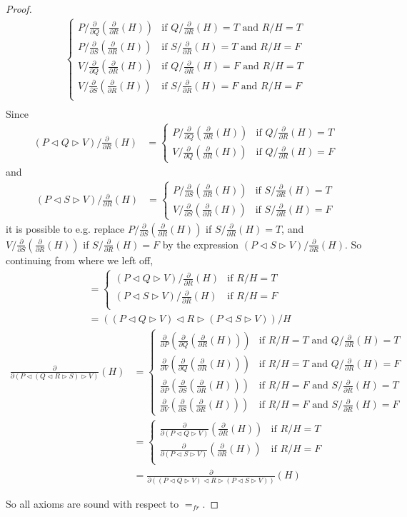 \documentclass[a4paper,twoside,openright]{report}
\newcommand{\dd}[1]{\frac{\partial}{\partial #1}}
\newcommand{\lef}{\ensuremath{\triangleleft}}
\newcommand{\rig}{\ensuremath{\triangleright}}
\begin{document}
\begin{proof}
\begin{align*}
\begin{cases}
P/\dd Q(\dd R(H)) & \text{if $Q/\dd R(H)=T$ and $R/H=T$}\\
P/\dd S(\dd R(H)) & \text{if $S/\dd R(H)=T$ and $R/H=F$}\\
V/\dd Q(\dd R(H)) & \text{if $Q/\dd R(H)=F$ and $R/H=T$}\\
V/\dd S(\dd R(H)) & \text{if $S/\dd R(H)=F$ and $R/H=F$}\\
\end{cases}\\
\end{align*}
Since
\begin{align*}
(P\lef Q\rig V)/\dd R(H)
&= \begin{cases}
P/\dd Q(\dd R(H)) & \text{if $Q/\dd R(H)=T$}\\
V/\dd Q(\dd R(H)) & \text{if $Q/\dd R(H)=F$}
\end{cases}
\end{align*}
and
\begin{align*}
(P\lef S\rig V)/\dd R(H)
&= \begin{cases}
P/\dd S(\dd R(H)) & \text{if $S/\dd R(H)=T$}\\
V/\dd S(\dd R(H)) & \text{if $S/\dd R(H)=F$}
\end{cases}
\end{align*}
it is possible to e.g. replace $P/\dd S(\dd R(H))$ if $S/\dd R(H)=T$,
and $V/\dd S(\dd R(H))$ if $S/\dd R(H)=F$ by the expression $(P\lef
S\rig V)/\dd R(H)$. So continuing from where we left off,
\begin{align*}
&=\begin{cases}
(P\lef Q\rig V)/\dd R(H) & \text{if $R/H=T$}\\
(P\lef S\rig V)/\dd R(H) & \text{if $R/H=F$}\\
\end{cases}\\
&=((P\lef Q\rig V)\lef R\rig (P\lef S\rig V))/H
\end{align*}
\begin{align*}
\dd{(P\lef(Q\lef R\rig S)\rig V)}(H)
&=\begin{cases}
\dd P(\dd Q(\dd R(H))) & \text{if $R/H=T$ and $Q/\dd R(H)=T$}\\
\dd V(\dd Q(\dd R(H))) & \text{if $R/H=T$ and $Q/\dd R(H)=F$}\\
\dd P(\dd S(\dd R(H))) & \text{if $R/H=F$ and $S/\dd R(H)=T$}\\
\dd V(\dd S(\dd R(H))) & \text{if $R/H=F$ and $S/\dd R(H)=F$}
\end{cases}\\
&=\begin{cases}
\dd{(P\lef Q\rig V)}(\dd R(H)) & \text{if $R/H=T$}\\
\dd{(P\lef S\rig V)}(\dd R(H)) & \text{if $R/H=F$}\\
\end{cases}\\
&=\dd{((P\lef Q\rig V)\lef R\rig(P\lef S\rig V))}(H)
\end{align*}

So all axioms are sound with respect to $=_{fr}$.
\end{proof}
\end{document}
